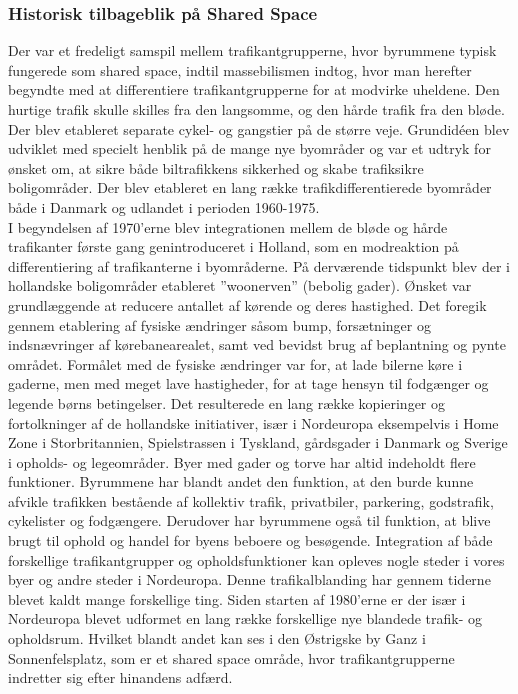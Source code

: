 \subsubsection{Historisk tilbageblik på Shared Space}
\label{subs:historisk_tilbageblik_paa_shared_space}
Der var et fredeligt samspil mellem trafikantgrupperne, hvor byrummene typisk fungerede som shared space, indtil massebilismen indtog, hvor man herefter begyndte med at differentiere trafikantgrupperne for at modvirke uheldene. Den hurtige trafik skulle skilles fra den langsomme, og den hårde trafik fra den bløde. Der blev etableret separate cykel- og gangstier på de større veje. Grundidéen blev udviklet med specielt henblik på de mange nye byområder og var et udtryk for ønsket om, at sikre både biltrafikkens sikkerhed og skabe trafiksikre boligområder. Der blev etableret en lang række trafikdifferentierede byområder både i Danmark og udlandet i perioden 1960-1975.
\\
I begyndelsen af 1970’erne blev integrationen mellem de bløde og hårde trafikanter første gang genintroduceret i Holland, som en modreaktion på differentiering af trafikanterne i byområderne. På derværende tidspunkt blev der i hollandske boligområder etableret ”woonerven” (bebolig gader). Ønsket var grundlæggende at reducere antallet af kørende og deres hastighed. Det foregik gennem etablering af fysiske ændringer såsom bump, forsætninger og indsnævringer af kørebanearealet, samt ved bevidst brug af beplantning og pynte området. Formålet med de fysiske ændringer var for, at lade bilerne køre i gaderne, men med meget lave hastigheder, for at tage hensyn til fodgænger og legende børns betingelser.  Det resulterede en lang række kopieringer og fortolkninger af de hollandske initiativer, især i Nordeuropa eksempelvis i Home Zone i Storbritannien, Spielstrassen i Tyskland, gårdsgader i Danmark og Sverige i opholds- og legeområder.
Byer med gader og torve har altid indeholdt flere funktioner.  Byrummene har blandt andet den funktion, at den burde kunne afvikle trafikken bestående af kollektiv trafik, privatbiler, parkering, godstrafik, cykelister og fodgængere. Derudover har byrummene også til funktion, at blive brugt til ophold og handel for byens beboere og besøgende.
Integration af både forskellige trafikantgrupper og opholdsfunktioner kan opleves nogle steder i vores byer og andre steder i Nordeuropa. Denne trafikalblanding har gennem tiderne blevet kaldt mange forskellige ting. Siden starten af 1980’erne er der især i Nordeuropa blevet udformet en lang række forskellige nye blandede trafik- og opholdsrum. \autocite{vejlednigomss2013}Hvilket blandt andet kan ses i den Østrigske by Ganz i Sonnenfelsplatz, som er et shared space område, hvor trafikantgrupperne indretter sig efter hinandens adfærd.\autocite{SP2015}

